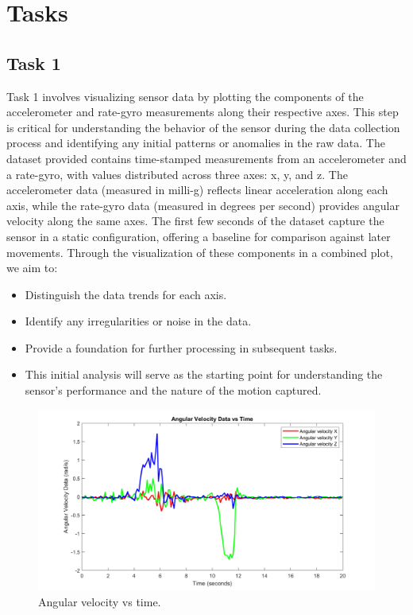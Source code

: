 \documentclass[12pt]{article}
\begin{document}
\newpage

\section{Tasks}

\subsection{Task 1}

Task 1 involves visualizing sensor data by plotting the components of the accelerometer and rate-gyro measurements along their respective axes. This step is critical for understanding the behavior of the sensor during the data collection process and identifying any initial patterns or anomalies in the raw data.
The dataset provided contains time-stamped measurements from an accelerometer and a rate-gyro, with values distributed across three axes: x, y, and z. The accelerometer data (measured in milli-g) reflects linear acceleration along each axis, while the rate-gyro data (measured in degrees per second) provides angular velocity along the same axes. The first few seconds of the dataset capture the sensor in a static configuration, offering a baseline for comparison against later movements.
Through the visualization of these components in a combined plot, we aim to:

\begin{itemize}
    \item Distinguish the data trends for each axis.
    \item Identify any irregularities or noise in the data.
    \item Provide a foundation for further processing in subsequent tasks.
    \item This initial analysis will serve as the starting point for understanding the sensor's performance and the nature of the motion captured.
\end{itemize}


\begin{figure}[H]
    \centerline{\includegraphics[scale=0.55]{Imagens/angularvstime.png}}
    \caption{Angular velocity vs time.}
    \label{fig}
\end{figure}
\end{document}
